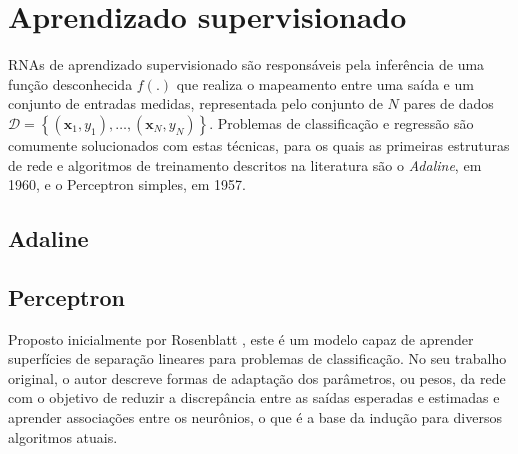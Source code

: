 \documentclass[conference]{IEEEtran}
\begin{document}
%
%
	
	\section{Aprendizado supervisionado}
	RNAs de aprendizado supervisionado são responsáveis pela inferência de uma função desconhecida $f(.)$ que realiza o mapeamento entre uma saída e um conjunto de entradas medidas, representada pelo conjunto de $N$ pares de dados $\mathcal{D} = \left\lbrace (\mathbf{x}_1, y_1), \dots, (\mathbf{x}_N, y_N)\right\rbrace $. Problemas de classificação e regressão são comumente solucionados com estas técnicas, para os quais as primeiras estruturas de rede e algoritmos de treinamento descritos na literatura são o \textit{Adaline}, em 1960, e o Perceptron simples, em 1957. 

	\subsection{Adaline}	

	\subsection{Perceptron}
	Proposto inicialmente por Rosenblatt \cite{rosenblatt1957perceptron}, este é um modelo capaz de aprender  superfícies de separação lineares para problemas de classificação. No seu trabalho original, o autor descreve formas de adaptação dos parâmetros, ou pesos, da rede com o objetivo de reduzir a discrepância entre as saídas esperadas e estimadas e aprender associações entre os neurônios, o que é a base da indução para diversos algoritmos atuais.
	
\end{document}
